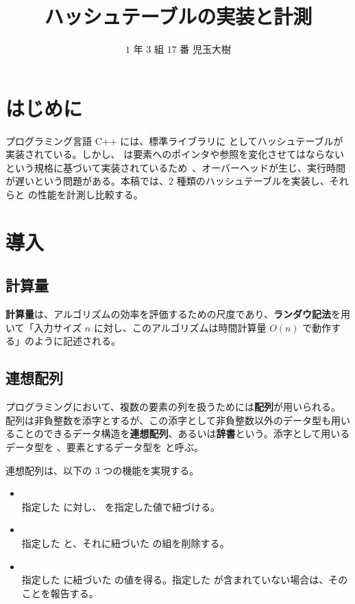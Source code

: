 \documentclass[dvipdfmx,a4j,10pt]{jarticle}
\begin{document}
\title{ハッシュテーブルの実装と計測}
\author{$1$ 年 $3$ 組 $17$ 番 児玉大樹}
\date{}
\maketitle
\thispagestyle{empty}

\section{はじめに}

プログラミング言語 C++ には、標準ライブラリに  としてハッシュテーブルが実装されている。しかし、 は要素へのポインタや参照を変化させてはならないという規格に基づいて実装されているため~\cite{C++Draft}、オーバーヘッドが生じ、実行時間が遅いという問題がある。本稿では、$2$ 種類のハッシュテーブルを実装し、それらと  の性能を計測し比較する。

\section{導入}

\subsection{計算量}

\textbf{計算量}は、アルゴリズムの効率を評価するための尺度であり、\textbf{ランダウ記法}を用いて「入力サイズ $n$ に対し、このアルゴリズムは時間計算量 $O(n)$ で動作する」のように記述される。

\subsection{連想配列}

プログラミングにおいて、複数の要素の列を扱うためには\textbf{配列}が用いられる。
配列は非負整数を添字とするが、この添字として非負整数以外のデータ型も用いることのできるデータ構造を\textbf{連想配列}、あるいは\textbf{辞書}という。添字として用いるデータ型を 、要素とするデータ型を  と呼ぶ。

連想配列は、以下の $3$ つの機能を実現する。

\begin{itemize}
  \item {} \mbox{}\\ 指定した  に対し、 を指定した値で紐づける。
  \item {} \mbox{}\\ 指定した  と、それに紐づいた  の組を削除する。
  \item {} \mbox{}\\ 指定した  に紐づいた  の値を得る。指定した  が含まれていない場合は、そのことを報告する。
\end{itemize}
\end{document}
